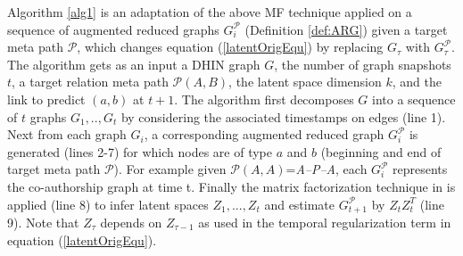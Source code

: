 Algorithm \ref{alg1} is an adaptation of the above MF technique applied on a sequence of augmented reduced graphs $G^\mathcal{P}_i$ (Definition \ref{def:ARG}) given a target meta path $\mathcal{P}$, which changes equation (\ref{latentOrigEqu}) by replacing $G_\tau$ with $G^\mathcal{P}_\tau$.
The algorithm gets as an input a DHIN graph $G$, the number of graph snapshots $t$, a target relation meta path $\mathcal{P}(A,B)$, the latent space dimension $k$, and the link to predict $(a,b)$ at $t+1$. The algorithm first decomposes $G$ into a sequence of $t$ graphs $G_1, .., G_t$ by considering the associated timestamps on edges (line 1). Next from each graph $G_i$, a corresponding augmented reduced graph $G^\mathcal{P}_i$ is generated (lines 2-7) for which nodes are of type $a$ and $b$ (beginning and end of target  meta path $\mathcal{P}$). For example given $\mathcal{P}(A,A)$=\textit{A--P--A}, each $G^\mathcal{P}_i$ represents the co-authorship graph at time t. Finally the matrix factorization technique in \cite{Zhu2016} is applied (line 8) to infer latent spaces $Z_1, ...,Z_t$ and estimate $G^\mathcal{P}_{t+1}$ by $Z_tZ_t^T$ (line 9). Note that $Z_\tau$ depends on $Z_{\tau-1}$ as used in the temporal regularization term in equation (\ref{latentOrigEqu}).



